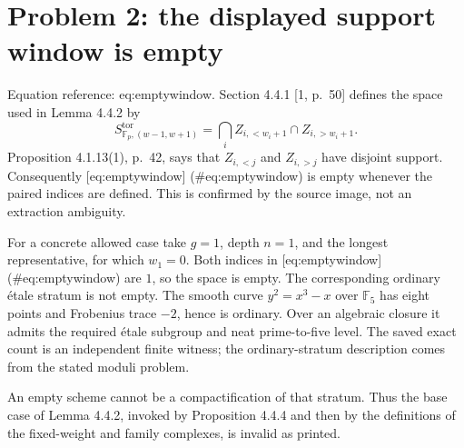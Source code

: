 \documentclass[10pt]{article}
\begin{document}
\section*{Problem 2: the displayed support window is empty}
Equation reference: eq:emptywindow. Section 4.4.1 [1, p. 50] defines the space used in Lemma 4.4.2 by \[
 S_{\mathbb F_p,(w-1,w+1)}^{\mathrm{tor}}
 =\bigcap_i Z_{i,<w_i+1}\cap Z_{i,>w_i+1}.\] Proposition 4.1.13(1), p. 42, says that \(Z_{i,<j}\) and \(Z_{i,>j}\) have disjoint support. Consequently [eq:emptywindow] (\#eq:emptywindow) is empty whenever the paired indices are defined. This is confirmed by the source image, not an extraction ambiguity.\par
For a concrete allowed case take \(g=1\), depth \(n=1\), and the longest representative, for which \(w_1=0\). Both indices in [eq:emptywindow] (\#eq:emptywindow) are \(1\), so the space is empty. The corresponding ordinary étale stratum is not empty. The smooth curve \(y^2=x^3-x\) over \(\mathbb F_5\) has eight points and Frobenius trace \(-2\), hence is ordinary. Over an algebraic closure it admits the required étale subgroup and neat prime-to-five level. The saved exact count is an independent finite witness; the ordinary-stratum description comes from the stated moduli problem.\par
An empty scheme cannot be a compactification of that stratum. Thus the base case of Lemma 4.4.2, invoked by Proposition 4.4.4 and then by the definitions of the fixed-weight and family complexes, is invalid as printed.\par
\end{document}
